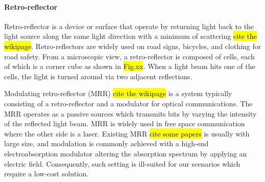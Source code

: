 




\paragraph{Retro-reflector} 
Retro-reflector is a device or surface that operate by returning light back to the light source along the same light direction with a minimum of scattering \hl{cite the wikipage}. Retro-reflectors are widely used on road signs, bicycles, and clothing for road safety. From a microscopic view, a retro-reflector is composed of cells, each of which is a corner cube as shown in \hl{Fig.xx}. When a light beam hits one of the cells, the light is turned around via two adjacent reflections. 

Modulating retro-reflector (MRR) \hl{cite the wikipage} is a system typically consisting of a retro-reflector and a modulator for optical communications. The MRR operates as a passive sources which transmits bits by varying the intensity of the reflected light beam. MRR is widely used in free space communication where the other side is a laser. Existing MRR \hl{cite some papers} is usually with large size, and modulation is commonly achieved with a high-end electroabsorption modulator altering the absorption spectrum by applying an electric field. Consequently, such setting is ill-suited for our scenarios which require a low-cost solution.

